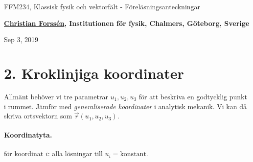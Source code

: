 \documentclass[%
oneside,                 %
final,                   %
10pt]{article}
\begin{document}

\newcommand{\exercisesection}[1]{\subsection*{#1}}







\thispagestyle{empty}

\begin{center}
{\LARGE\bf
\begin{spacing}{1.25}
FFM234, Klassisk fysik och vektorfält - Föreläsningsanteckningar
\end{spacing}
}
\end{center}


\begin{center}
{\bf \href{{http://fy.chalmers.se/subatom/tsp/}}{Christian Forssén}, Institutionen för fysik, Chalmers, Göteborg, Sverige${}^{}$} \\ [0mm]
\end{center}

\begin{center}
\end{center}
    

\begin{center}
Sep 3, 2019
\end{center}

\vspace{1cm}


\section*{2. Kroklinjiga koordinater}

Allmänt behöver vi tre parametrar $u_1, u_2, u_3$ för att beskriva en godtycklig punkt i rummet. Jämför med \emph{generaliserade koordinater} i analytisk mekanik. Vi kan då skriva ortsvektorn som $\vec{r}(u_1, u_2, u_3)$.  

\paragraph{Koordinatyta.}
för koordinat $i$: alla lösningar till $u_i = \mathrm{konstant}$.
\end{document}

